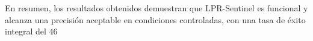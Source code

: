 
















En resumen, los resultados obtenidos demuestran que LPR-Sentinel es funcional y alcanza una precisión aceptable en condiciones controladas, con una tasa de éxito integral del 46%
























